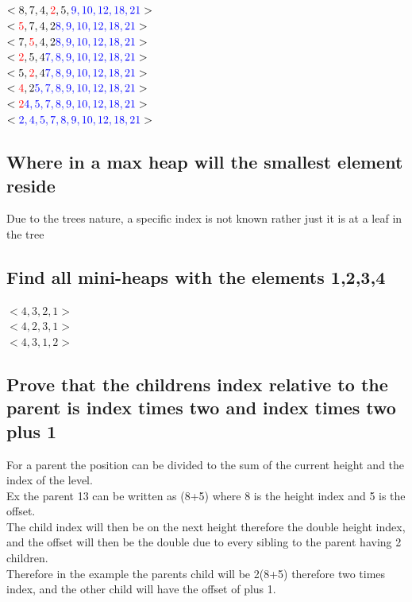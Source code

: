 \documentclass[12pt, a4paper]{article}
\begin{document}
				$<8,7,4,\color{red}2\color{black},5,\color{blue}9,10,12,18,21\color{black}>$\\
				$<\color{red}5\color{black},7,4,2\color{blue}8,9,10,12,18,21\color{black}>$\\
				$<7,\color{red}5\color{black},4,2\color{blue}8,9,10,12,18,21\color{black}>$\\
				$<\color{red}2\color{black},5,4\color{blue}7,8,9,10,12,18,21\color{black}>$\\
				$<5,\color{red}2\color{black},4\color{blue}7,8,9,10,12,18,21\color{black}>$\\
				$<\color{red}4\color{black},2\color{blue}5,7,8,9,10,12,18,21\color{black}>$\\
				$<\color{red}2\color{black}\color{blue}4,5,7,8,9,10,12,18,21\color{black}>$\\
				$<\color{blue}2,4,5,7,8,9,10,12,18,21\color{black}>$\\
			\subsection{Where in a max heap will the smallest element reside}
				Due to the trees nature, a specific index is not known rather just it is at a leaf in the tree
			\subsection{Find all mini-heaps with the elements 1,2,3,4}
				$<4,3,2,1>$\\
				$<4,2,3,1>$\\
				$<4,3,1,2>$\\
			\subsection{Prove that the childrens index relative to the parent is index times two and index times two plus 1}
				For a parent the position can be divided to the sum of the current height and the index of the level.\\
				Ex the parent 13 can be written as (8+5) where 8 is the height index and 5 is the offset.\\
				The child index will then be on the next height therefore the double height index, and the offset will then be the double due to every sibling to the parent having 2 children.\\
				Therefore in the example the parents child will be 2(8+5) therefore two times index, and the other child will have the offset of plus 1.
\end{document}
